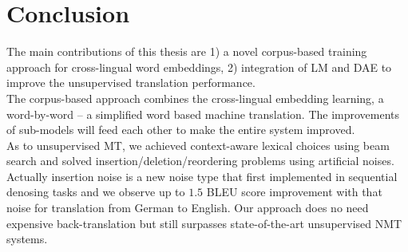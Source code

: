 \chapter{Conclusion}
%
%

The main contributions of this thesis are 1) a novel corpus-based training approach for cross-lingual word embeddings, 2) integration of LM and DAE to improve the unsupervised translation performance. \\
The corpus-based approach combines the cross-lingual embedding learning, a word-by-word -- a simplified word based machine translation. The improvements of sub-models will feed each other to make the entire system improved. \\
As to unsupervised MT, we achieved context-aware lexical choices using beam search and solved insertion/deletion/reordering problems using artificial noises. Actually insertion noise is a new noise type that first implemented in sequential denosing tasks and we observe up to $1.5$ BLEU score improvement with that noise for translation from German to English.  Our approach does no need expensive back-translation but still surpasses state-of-the-art unsupervised NMT systems.